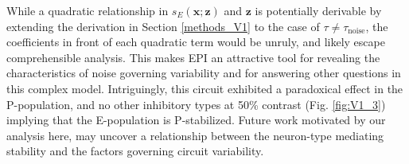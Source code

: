 \documentclass[11pt]{article}
\begin{document}
While a quadratic relationship in $s_E(\mathbf{x}; \mathbf{z})$ and $\mathbf{z}$ is potentially derivable by extending the derivation in Section \ref{methods_V1} to the case of $\tau \neq \tau_{\text{noise}}$, the coefficients in front of each quadratic term would be unruly, and likely escape comprehensible analysis.
This makes EPI an attractive tool for revealing the characteristics of noise governing variability and for answering other questions in this complex model.
Intriguingly, this circuit exhibited a paradoxical effect in the P-population, and no other inhibitory types at 50\% contrast (Fig. \ref{fig:V1_3}) implying that the E-population is P-stabilized.
Future work motivated by our analysis here, may uncover a relationship between the neuron-type mediating stability and the factors governing circuit variability.


\end{document}
